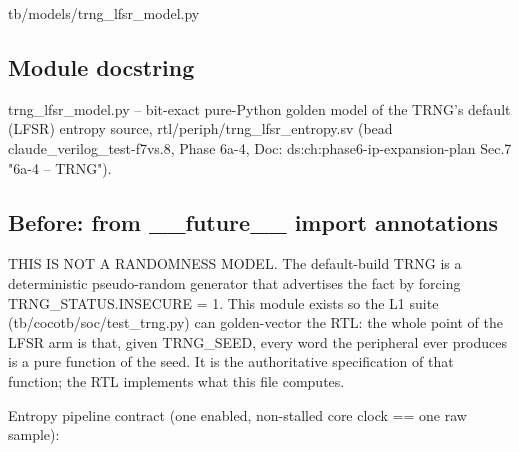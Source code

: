 \begin{relocated}{tb/models/trng_lfsr_model.py}

\subsection*{Module docstring}

\begin{textblock}
trng_lfsr_model.py -- bit-exact pure-Python golden model of the TRNG's default (LFSR) entropy
source, rtl/periph/trng_lfsr_entropy.sv (bead claude_verilog_test-f7vs.8, Phase 6a-4,
Doc: ds:ch:phase6-ip-expansion-plan Sec.7 "6a-4 -- TRNG").
\end{textblock}

\subsection*{Before: from \_\_future\_\_ import annotations}

\begin{textblock}
THIS IS NOT A RANDOMNESS MODEL. The default-build TRNG is a deterministic pseudo-random generator
that advertises the fact by forcing TRNG_STATUS.INSECURE = 1. This module exists so the L1 suite
(tb/cocotb/soc/test_trng.py) can golden-vector the RTL: the whole point of the LFSR arm is that,
given TRNG_SEED, every word the peripheral ever produces is a pure function of the seed. It is the
authoritative specification of that function; the RTL implements what this file computes.

Entropy pipeline contract (one enabled, non-stalled core clock == one raw sample):


\end{textblock}
\end{relocated}
